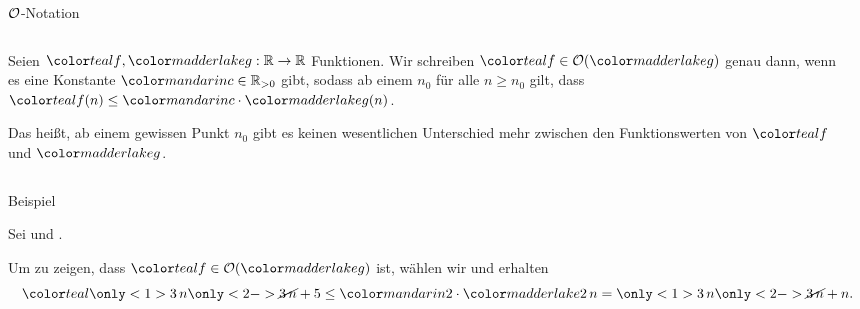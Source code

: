 \begin{frame}{\MakeUppercase{$\mathcal{O}$}-Notation}
\begin{columns}[T,onlytextwidth]
\begin{column}{0.47\textwidth}
    \begin{definition}
    Seien $\teal{f}, \red{g}: \real \to \real$ Funktionen.
    Wir schreiben $\teal{f} \in \bigO(\red{g})$ genau dann, wenn es eine Konstante $\orange{c} \in \realpos$ gibt, sodass ab einem $n_0$ f\"ur alle $n \geq n_0$ gilt, dass $\teal{f}(n) \leq \orange{c} \cdot \red{g}(n)$.
    \end{definition}
    
    \medskip
    
    {\footnotesize Das hei{\ss}t, ab einem gewissen Punkt $n_0$ gibt es keinen \alert{wesentlichen} Unterschied mehr zwischen den Funktionswerten von $\teal{f}$ und $\red{g}$.}
\end{column}
\begin{column}{0.47\textwidth}
\end{column}
\end{columns}
\end{frame}

\begin{frame}{Beispiel}
\begin{example}
Sei  und .

Um zu zeigen, dass $\teal{f} \in \bigO(\red{g})$ ist, w\"ahlen wir  und erhalten
\begin{equation*}
    \teal{\only<1>{3 \, n} \only<2->{\cancel{3 \, n}} + 5} \leq \orange{2} \cdot \red{2 \, n} = \only<1>{3 \, n} \only<2->{\cancel{3 \, n}} + n.
\end{equation*}
\end{example}
\end{frame}

